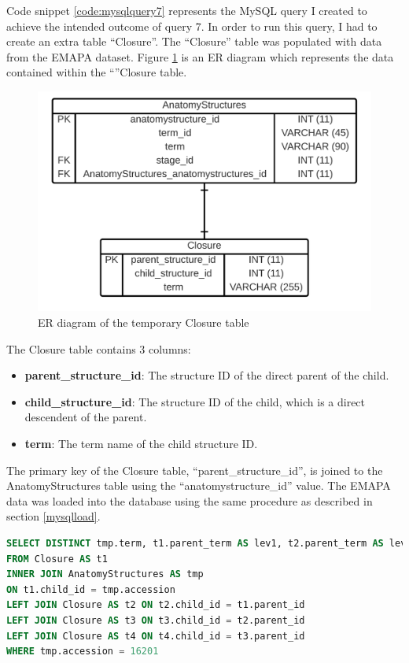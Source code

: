Code snippet \ref{code:mysqlquery7} represents the MySQL query I created to achieve the intended outcome of query 7. In order to run this query, I had to create an extra table ``Closure''. The ``Closure'' table was populated with data from the EMAPA dataset. Figure \ref{fig:closuretable} is an ER diagram which represents the data contained within the ``''Closure table.

\begin{figure}[H]\begin{center}\includegraphics[width=1\linewidth]{images/closuretableER}\caption{ER diagram of the temporary Closure table}\label{fig:closuretable}\end{center}\end{figure}

The Closure table contains 3 columns:

\begin{itemize}
\item \textbf{parent\_structure\_id}: The structure ID of the direct parent of the child.
\item \textbf{child\_structure\_id}: The structure ID of the child, which is a direct descendent of the parent.
\item \textbf{term}: The term name of the child structure ID.
\end{itemize}

The primary key of the Closure table, ``parent\_structure\_id'', is joined to the AnatomyStructures table using the ``anatomystructure\_id'' value. The EMAPA data was loaded into the database using the same procedure as described in section \ref{mysqlload}.

\begin{lstlisting}[language=SQL, caption=MySQL query 7 statement. Calculate transitive closure., label=code:mysqlquery7]
SELECT DISTINCT tmp.term, t1.parent_term AS lev1, t2.parent_term AS lev2, t3.parent_term AS lev3, t4.parent_term AS lev4
FROM Closure AS t1
INNER JOIN AnatomyStructures AS tmp
ON t1.child_id = tmp.accession
LEFT JOIN Closure AS t2 ON t2.child_id = t1.parent_id
LEFT JOIN Closure AS t3 ON t3.child_id = t2.parent_id
LEFT JOIN Closure AS t4 ON t4.child_id = t3.parent_id
WHERE tmp.accession = 16201
\end{lstlisting}

